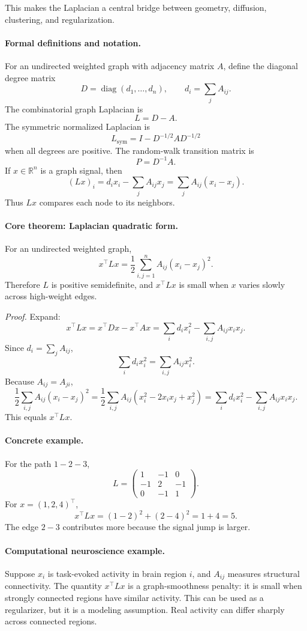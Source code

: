 This makes the Laplacian a central bridge between geometry, diffusion, clustering, and regularization.

\paragraph{Formal definitions and notation.}
For an undirected weighted graph with adjacency matrix \(A\), define the diagonal degree matrix
\[
D=\operatorname{diag}(d_1,\ldots,d_n),
\qquad d_i=\sum_j A_{ij}.
\]
The combinatorial graph Laplacian is
\[
\boxed{L=D-A.}
\]
The symmetric normalized Laplacian is
\[
L_{\mathrm{sym}}=I-D^{-1/2}AD^{-1/2}
\]
when all degrees are positive. The random-walk transition matrix is
\[
P=D^{-1}A.
\]
If \(x\in\mathbb R^n\) is a graph signal, then
\[
(Lx)_i=d_i x_i-\sum_j A_{ij}x_j
=\sum_j A_{ij}(x_i-x_j).
\]
Thus \(Lx\) compares each node to its neighbors.

\paragraph{Core theorem: Laplacian quadratic form.}
For an undirected weighted graph,
\[
\boxed{x^\top Lx=\frac12\sum_{i,j=1}^n A_{ij}(x_i-x_j)^2.}
\]
Therefore \(L\) is positive semidefinite, and \(x^\top Lx\) is small when \(x\) varies slowly across high-weight edges.

\emph{Proof.} Expand:
\[
x^\top Lx=x^\top Dx-x^\top Ax
=\sum_i d_i x_i^2-\sum_{i,j}A_{ij}x_i x_j.
\]
Since \(d_i=\sum_j A_{ij}\),
\[
\sum_i d_i x_i^2=\sum_{i,j}A_{ij}x_i^2.
\]
Because \(A_{ij}=A_{ji}\),
\[
\frac12\sum_{i,j}A_{ij}(x_i-x_j)^2
=\frac12\sum_{i,j}A_{ij}(x_i^2-2x_ix_j+x_j^2)
=\sum_i d_ix_i^2-\sum_{i,j}A_{ij}x_ix_j.
\]
This equals \(x^\top Lx\).

\paragraph{Concrete example.}
For the path \(1-2-3\),
\[
L=
\begin{pmatrix}
1&-1&0\\
-1&2&-1\\
0&-1&1
\end{pmatrix}.
\]
For \(x=(1,2,4)^\top\),
\[
x^\top Lx=(1-2)^2+(2-4)^2=1+4=5.
\]
The edge \(2-3\) contributes more because the signal jump is larger.

\paragraph{Computational neuroscience example.}
Suppose \(x_i\) is task-evoked activity in brain region \(i\), and \(A_{ij}\) measures structural connectivity. The quantity \(x^\top Lx\) is a graph-smoothness penalty: it is small when strongly connected regions have similar activity. This can be used as a regularizer, but it is a modeling assumption. Real activity can differ sharply across connected regions.

